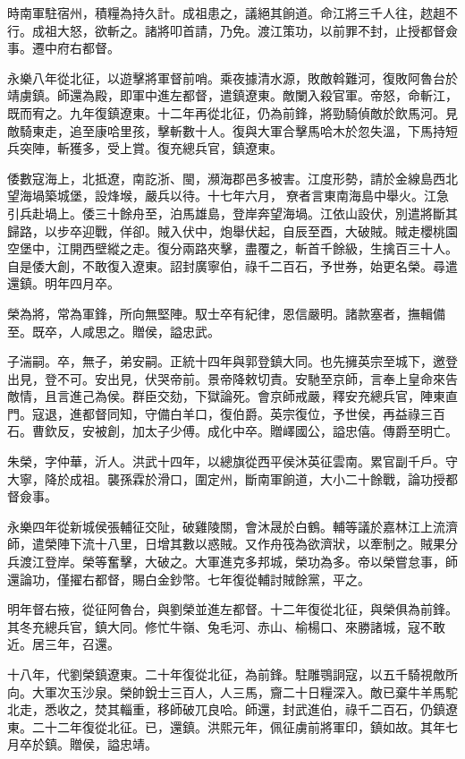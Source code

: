 \begin{pinyinscope}
時南軍駐宿州，積糧為持久計。成祖患之，議絕其餉道。命江將三千人往，趑趄不行。成祖大怒，欲斬之。諸將叩首請，乃免。渡江策功，以前罪不封，止授都督僉事。遷中府右都督。

永樂八年從北征，以遊擊將軍督前哨。乘夜據清水源，敗敵斡難河，復敗阿魯台於靖虜鎮。師還為殿，即軍中進左都督，遣鎮遼東。敵闌入殺官軍。帝怒，命斬江，既而宥之。九年復鎮遼東。十二年再從北征，仍為前鋒，將勁騎偵敵於飲馬河。見敵騎東走，追至康哈里孩，擊斬數十人。復與大軍合擊馬哈木於忽失溫，下馬持短兵突陣，斬獲多，受上賞。復充總兵官，鎮遼東。

倭數寇海上，北抵遼，南訖浙、閩，瀕海郡邑多被害。江度形勢，請於金線島西北望海堝築城堡，設烽堠，嚴兵以待。十七年六月，尞者言東南海島中舉火。江急引兵赴堝上。倭三十餘舟至，泊馬雄島，登岸奔望海堝。江依山設伏，別遣將斷其歸路，以步卒迎戰，佯卻。賊入伏中，炮舉伏起，自辰至酉，大破賊。賊走櫻桃園空堡中，江開西壁縱之走。復分兩路夾擊，盡覆之，斬首千餘級，生擒百三十人。自是倭大創，不敢復入遼東。詔封廣寧伯，祿千二百石，予世券，始更名榮。尋遣還鎮。明年四月卒。

榮為將，常為軍鋒，所向無堅陣。馭士卒有紀律，恩信嚴明。諸款塞者，撫輯備至。既卒，人咸思之。贈侯，謚忠武。

子湍嗣。卒，無子，弟安嗣。正統十四年與郭登鎮大同。也先擁英宗至城下，邀登出見，登不可。安出見，伏哭帝前。景帝降敕切責。安馳至京師，言奉上皇命來告敵情，且言進己為侯。群臣交劾，下獄論死。會京師戒嚴，釋安充總兵官，陣東直門。寇退，進都督同知，守備白羊口，復伯爵。英宗復位，予世侯，再益祿三百石。曹欽反，安被創，加太子少傅。成化中卒。贈嶧國公，謚忠僖。傳爵至明亡。

朱榮，字仲華，沂人。洪武十四年，以總旗從西平侯沐英征雲南。累官副千戶。守大寧，降於成祖。襲孫霖於滑口，圍定州，斷南軍餉道，大小二十餘戰，論功授都督僉事。

永樂四年從新城侯張輔征交阯，破雞陵關，會沐晟於白鶴。輔等議於嘉林江上流濟師，遣榮陣下流十八里，日增其數以惑賊。又作舟筏為欲濟狀，以牽制之。賊果分兵渡江登岸。榮等奮擊，大破之。大軍進克多邦城，榮功為多。帝以榮嘗怠事，師還論功，僅擢右都督，賜白金鈔幣。七年復從輔討賊餘黨，平之。

明年督右掖，從征阿魯台，與劉榮並進左都督。十二年復從北征，與榮俱為前鋒。其冬充總兵官，鎮大同。修忙牛嶺、兔毛河、赤山、榆楊口、來勝諸城，寇不敢近。居三年，召還。

十八年，代劉榮鎮遼東。二十年復從北征，為前鋒。駐雕鶚詗寇，以五千騎視敵所向。大軍次玉沙泉。榮帥銳士三百人，人三馬，齎二十日糧深入。敵已棄牛羊馬駝北走，悉收之，焚其輜重，移師破兀良哈。師還，封武進伯，祿千二百石，仍鎮遼東。二十二年復從北征。已，還鎮。洪熙元年，佩征虜前將軍印，鎮如故。其年七月卒於鎮。贈侯，謚忠靖。


\end{pinyinscope}
